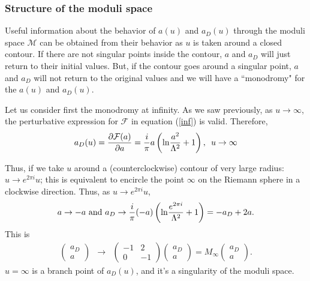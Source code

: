 \documentclass[12pt, onecolumn]{article}
\begin{document}
\subsubsection{Structure of the moduli space}


Useful information about the behavior of $a(u)$ and $a_D(u)$ through the moduli space $\mathcal{M}$ can be obtained from their behavior as $u$ is taken around a closed contour. If there are not singular points inside the contour, $a$ and $a_D$ will just return to their initial values.  But, if the contour goes around a singular point, $a$ and $a_D$ will not return to the original values and we will have a ``monodromy" for the $a(u)$ and $a_D(u)$. 

Let us consider first the monodromy at infinity. As we saw previously, as $u\rightarrow \infty$, the perturbative expression for $\mathcal{F}$ in equation (\ref{inf}) is valid. Therefore, 
\begin{equation}
a_D(u)=\frac{\partial \mathcal{F}(a)}{\partial a } = \frac{i}{\pi}a \left( {\rm ln}\frac{a^2}{\Lambda^2}+1\right),\,\,\,u\rightarrow\infty \label{mon-inf}
\end{equation}

Thus, if we take $u$ around a (counterclockwise) contour of very large radius: $u\rightarrow e^{2\pi i}u$; this is equivalent to encircle the point $\infty $ on the Riemann sphere in a clockwise direction. Thus, as $u\rightarrow e^{2\pi i}u$, $$ a \rightarrow -a \,\,{\rm and} \,\, a_D \rightarrow \frac{i}{\pi} (-a) \left( {\rm ln} \frac{e^{2\pi i}}{\Lambda^2}+1\right) = -a_D+2a.$$ This is
\begin{eqnarray}
\left(\begin{matrix}
a_D \\ 
a
\end{matrix}\right)&\rightarrow & \left( \begin{matrix} 
-1 &2 \\ 
0& -1 \end{matrix} \right) \left(\begin{matrix}
a_D \\ 
a
\end{matrix}\right)  = M_\infty \left(\begin{matrix}
a_D \\ 
a
\end{matrix}\right).
\end{eqnarray} $u=\infty$ is a branch point of $a_D(u)$, and it's a singularity of the moduli space. 
\end{document}
